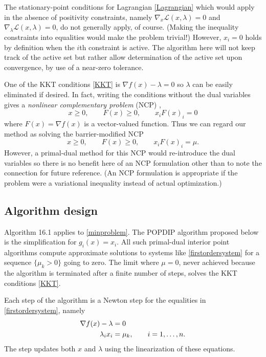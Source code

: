 \documentclass[11pt]{article}
\newcommand{\grad}{\nabla}
\begin{document}
The stationary-point conditions for Lagrangian \eqref{Lagrangian} which would apply in the absence of positivity constraints, namely $\grad_x\mathcal{L}(x,\lambda)=0$ and $\grad_\lambda\mathcal{L}(x,\lambda)=0$, do not generally apply, of course.  (Making the inequality constraints into equalities would make the problem trivial!)  However, $x_i=0$ holds by definition when the $i$th constraint is active.  The algorithm here will not keep track of the active set but rather allow determination of the active set upon convergence, by use of a near-zero tolerance.

One of the KKT conditions \eqref{KKT} is $\grad f(x)-\lambda=0$ so $\lambda$ can be easily eliminated if desired.  In fact, writing the conditions without the dual variables gives a \emph{nonlinear complementary problem} (NCP) \cite{FacchineiPang2007},
    $$x \ge 0, \qquad F(x) \ge 0, \qquad x_i F(x)_i = 0$$
where $F(x) = \grad f(x)$ is a vector-valued function.  Thus we can regard our method as solving the barrier-modified NCP
    $$x \ge 0, \qquad F(x) \ge 0, \qquad x_i F(x)_i = \mu.$$
However, a primal-dual method for this NCP would re-introduce the dual variables so there is no benefit here of an NCP formulation other than to note the connection for future reference.  (An NCP formulation is appropriate if the problem were a variational inequality \cite{BensonMunson2006,Bueler2016} instead of actual optimization.)


\subsection*{Algorithm design}

Algorithm 16.1 \cite{GrivaNashSofer2009} applies to \eqref{minproblem}.  The POPDIP algorithm proposed below is the simplification for $g_i(x)=x_i$.  All such primal-dual interior point algorithms \cite{NocedalWright2006} compute approximate solutions to systems like \eqref{firstordersystem} for a sequence $\{\mu_k>0\}$ going to zero.  The limit where $\mu=0$, never achieved because the algorithm is terminated after a finite number of steps, solves the KKT conditions \eqref{KKT}.

Each step of the algorithm is a Newton step for the equalities in \eqref{firstordersystem}, namely
\begin{align}
\grad f(x) - \lambda &= 0 \label{equalitysystem} \\
\lambda_i x_i &= \mu_k, \qquad i=1,\dots,n. \notag
\end{align}
The step updates both $x$ and $\lambda$ using the linearization of these equations.
\end{document}
